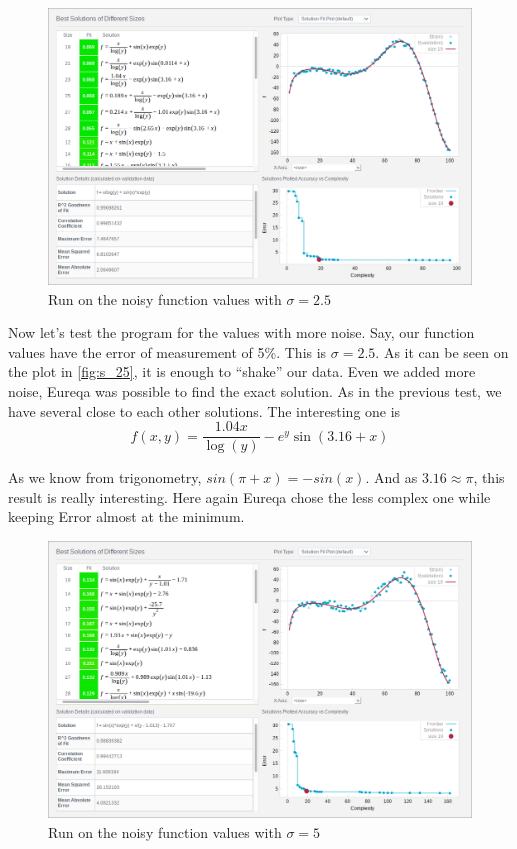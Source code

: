 \documentclass[12pt]{article}
\begin{document}
    \begin{figure}[H]
        \centering
        \includegraphics[width=\linewidth]{pics/sol_5perc.png}
        \caption{Run on the noisy function values with $\sigma = 2.5$}
        \label{fig:s_25}
    \end{figure}

    Now let's test the program for the values with more noise. Say, our function
    values have the error of measurement of 5\%. This is $\sigma = 2.5$. As it
    can be seen on the plot in \autoref{fig:s_25}, it is enough to ``shake'' our
    data. Even we added more noise, Eureqa was possible to find the exact solution.
    As in the previous test, we have several close to each other solutions. The
    interesting one is
    $$f(x, y) = \frac{1.04x}{\log(y)} - e^y\sin(3.16 + x)$$

    As we know from trigonometry, $sin(\pi + x) = -sin(x)$. And as $3.16 \approx
    \pi$, this result is really interesting. Here again Eureqa chose the less
    complex one while keeping Error almost at the minimum.

    \begin{figure}[H]
        \centering
        \includegraphics[width=\linewidth]{pics/sol_10perc.png}
        \caption{Run on the noisy function values with $\sigma = 5$}
        \label{fig:s_5}
    \end{figure}
\end{document}

